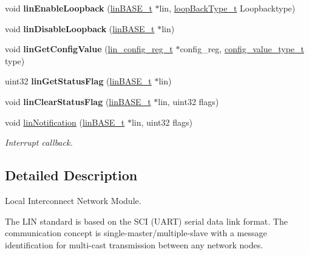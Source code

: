 \begin{DoxyCompactItemize}
void {\bfseries lin\+Enable\+Loopback} (\mbox{\hyperlink{reg__lin_8h_aaabd72fa55ff1fcbcc2882d92c5ff17e}{lin\+B\+A\+S\+E\+\_\+t}} $\ast$lin, \mbox{\hyperlink{sys__common_8h_aa61c8f392939c8448c7e3f17a3ecb51c}{loop\+Back\+Type\+\_\+t}} Loopbacktype)
\item 
\mbox{\label{group__LIN_gaf7a2352f02b5d3eebeb971cf2850d26c}} 
void {\bfseries lin\+Disable\+Loopback} (\mbox{\hyperlink{reg__lin_8h_aaabd72fa55ff1fcbcc2882d92c5ff17e}{lin\+B\+A\+S\+E\+\_\+t}} $\ast$lin)
\item 
\mbox{\label{group__LIN_gae06ac5c4465a07cf40a3a5d59b858401}} 
void {\bfseries lin\+Get\+Config\+Value} (\mbox{\hyperlink{structlin__config__reg}{lin\+\_\+config\+\_\+reg\+\_\+t}} $\ast$config\+\_\+reg, \mbox{\hyperlink{sys__common_8h_a9daf9a5992391b058477d28d107ee5e2}{config\+\_\+value\+\_\+type\+\_\+t}} type)
\item 
\mbox{\label{group__LIN_ga716bc11fe0c476f77e1ec6085cbb767d}} 
uint32 {\bfseries lin\+Get\+Status\+Flag} (\mbox{\hyperlink{reg__lin_8h_aaabd72fa55ff1fcbcc2882d92c5ff17e}{lin\+B\+A\+S\+E\+\_\+t}} $\ast$lin)
\item 
\mbox{\label{group__LIN_gadc5fe3d5f1aee358cdf97c390df60d2d}} 
void {\bfseries lin\+Clear\+Status\+Flag} (\mbox{\hyperlink{reg__lin_8h_aaabd72fa55ff1fcbcc2882d92c5ff17e}{lin\+B\+A\+S\+E\+\_\+t}} $\ast$lin, uint32 flags)
\item 
void \mbox{\hyperlink{group__LIN_gaa4341c36b53d2de417bf6063e61eb00e}{lin\+Notification}} (\mbox{\hyperlink{reg__lin_8h_aaabd72fa55ff1fcbcc2882d92c5ff17e}{lin\+B\+A\+S\+E\+\_\+t}} $\ast$lin, uint32 flags)
\begin{DoxyCompactList}\small\item\em Interrupt callback. \end{DoxyCompactList}\end{DoxyCompactItemize}


\subsection{Detailed Description}
Local Interconnect Network Module. 

The L\+IN standard is based on the S\+CI (U\+A\+RT) serial data link format. The communication concept is single-\/master/multiple-\/slave with a message identification for multi-\/cast transmission between any network nodes.

